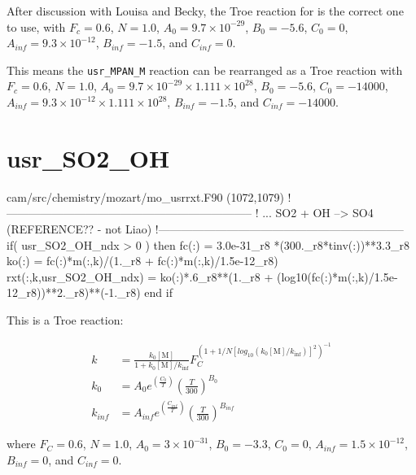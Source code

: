 \documentclass[titlepage]{article}
\begin{document}
After discussion with Louisa and Becky, the Troe reaction for  is the correct one to use, with $F_c = 0.6$, $N = 1.0$, $A_0 = 9.7 \times 10^{-29}$, $B_0 = -5.6$, $C_0 = 0$, $A_{inf} = 9.3 \times 10^{-12}$, $B_{inf} = -1.5$, and $C_{inf} = 0$.

This means the \verb>usr_MPAN_M> reaction can be rearranged as a Troe reaction with $F_c = 0.6$, $N = 1.0$, $A_0 = 9.7 \times 10^{-29} \times 1.111 \times 10^{28}$, $B_0 = -5.6$, $C_0 = -14000$, $A_{inf} = 9.3 \times 10^{-12} \times 1.111 \times 10^{28}$, $B_{inf} = -1.5$, and $C_{inf} = -14000$.


\section{usr\_SO2\_OH}

\begin{blockcode}[commandchars=\\\{\}]
\color{gray}cam/src/chemistry/mozart/mo_usrrxt.F90 (1072,1079)
!-----------------------------------------------------------------
!       ... SO2 + OH  --> SO4  (REFERENCE?? - not Liao)
!-----------------------------------------------------------------
       if( usr_SO2_OH_ndx > 0 ) then
          fc(:) = 3.0e-31_r8 *(300._r8*tinv(:))**3.3_r8
          ko(:) = fc(:)*m(:,k)/(1._r8 + fc(:)*m(:,k)/1.5e-12_r8)
          rxt(:,k,usr_SO2_OH_ndx) = ko(:)*.6_r8**(1._r8 + (log10(fc(:)*m(:,k)/1.5e-12_r8))**2._r8)**(-1._r8)
       end if
\end{blockcode}

This is a Troe reaction:

\begin{equation}
\begin{split}
k & = \frac{k_0[\mbox{M}]}{1+k_0[\mbox{M}]/k_{\inf}}F_C^{(1+1/N[log_{10}(k_0[\mbox{M}]/k_{\inf})]^2)^{-1}} \\
k_0 & = A_0 e^{\left( \frac{C_0}{T} \right)} \left( \frac{T}{300} \right)^{B_0} \\
k_{inf} & = A_{inf} e^{\left( \frac{C_{inf}}{T} \right)} \left( \frac{T}{300} \right)^{B_{inf}}
\end{split}
\end{equation}

\noindent where $F_C = 0.6$, $N = 1.0$, $A_0 = 3 \times 10^{-31}$, $B_0 = -3.3$, $C_0 = 0$, $A_{inf} = 1.5 \times 10^{-12}$, $B_{inf} = 0$, and $C_{inf} = 0$.
\end{document}

